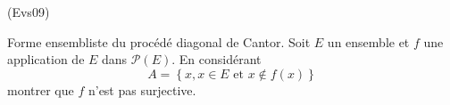 \begin{tiny}(Evs09)\end{tiny} Forme ensembliste du procédé diagonal de Cantor.\newline
Soit $E$ un ensemble et $f$ une application de $E$ dans $\mathcal{P}(E)$. En consid{\'e}rant
 \begin{displaymath}
A=\left\{ x,x\in E\text{ et }x\notin f(x)\right\} 
\end{displaymath}
montrer que $f$ n'est pas surjective.